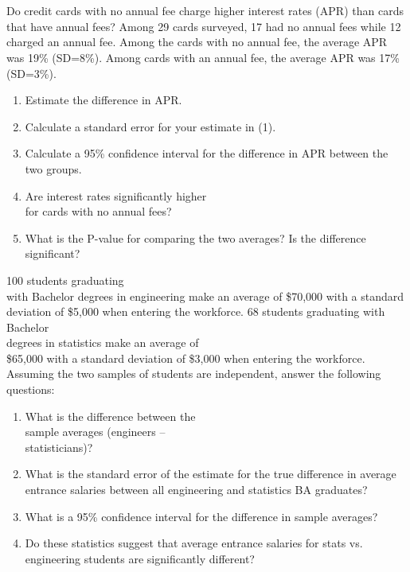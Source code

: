 \documentclass[11pt, chapterprefix=true]{scrbook}\usepackage[]{graphicx}\usepackage[]{color}
\begin{document}
\twocolumn

\section{}

\begin{exercises}
\begin{exercise} %

Do credit cards with no annual fee charge higher interest rates (APR) than cards that have annual fees?  Among 29 cards surveyed, 17 had no annual fees while 12 charged an annual fee.  Among the cards with no annual fee, the average APR was 19\% (SD=8\%).  Among cards with an annual fee, the average APR was 17\% (SD=3\%).

\begin{enumerate}
  \item Estimate the difference in APR.
  \item Calculate a standard error for your estimate in (1).
  \item Calculate a 95\% confidence interval for the difference in APR between the two groups.
  \item Are interest rates significantly higher \\ for cards with no annual fees?
  \item What is the P-value for comparing the two averages? Is the difference significant?
\end{enumerate}
\end{exercise}
\begin{solution} %


\end{solution}

\begin{exercise}  %

100 students graduating \\ with Bachelor degrees in engineering make an average of \$70,000 with a standard deviation of \$5,000 when entering the workforce. 68 students graduating with Bachelor \\ degrees in statistics make an average of \\ \$65,000 with a standard deviation of \$3,000 when entering the workforce. Assuming the two samples of students are independent, answer the following questions:

\begin{enumerate}
  \item What is the difference between the \\ sample averages (engineers – \\ statisticians)?
  \item What is the standard error of the estimate for the true difference in average entrance salaries between all engineering and statistics BA graduates?
  \item What is a 95\% confidence interval for the difference in sample averages?
  \item Do these statistics suggest that average entrance salaries for stats vs. engineering students are significantly different?
\end{enumerate}


\end{exercise}
\end{exercises}
\end{document}
